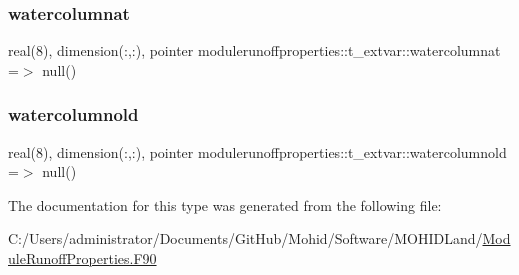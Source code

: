 \subsubsection{\texorpdfstring{watercolumnat}{watercolumnat}}
{\footnotesize\ttfamily real(8), dimension(\+:,\+:), pointer modulerunoffproperties\+::t\+\_\+extvar\+::watercolumnat =$>$ null()\hspace{0.3cm}{\ttfamily [private]}}

\mbox{\label{structmodulerunoffproperties_1_1t__extvar_a7e3b80c799e1487f27c21fdf52692054}} 
\subsubsection{\texorpdfstring{watercolumnold}{watercolumnold}}
{\footnotesize\ttfamily real(8), dimension(\+:,\+:), pointer modulerunoffproperties\+::t\+\_\+extvar\+::watercolumnold =$>$ null()\hspace{0.3cm}{\ttfamily [private]}}



The documentation for this type was generated from the following file\+:\begin{DoxyCompactItemize}
\item 
C\+:/\+Users/administrator/\+Documents/\+Git\+Hub/\+Mohid/\+Software/\+M\+O\+H\+I\+D\+Land/\mbox{\hyperlink{_module_runoff_properties_8_f90}{Module\+Runoff\+Properties.\+F90}}\end{DoxyCompactItemize}
